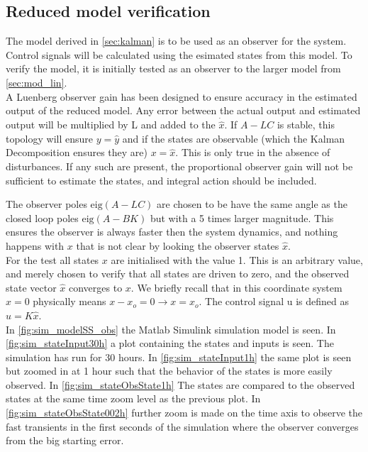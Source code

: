 \subsection{Reduced model verification}

The model derived in \cref{sec:kalman} is to be used as an observer for the system. Control signals will be calculated using the esimated states from this model. To verify the model, it is initially tested as an observer to the larger model from \cref{sec:mod_lin}.\\

A Luenberg observer gain has been designed to ensure accuracy in the estimated output of the reduced model. Any error between the actual output and estimated output will be multiplied by L and added to the $\dot{\hat{x}}$. If $A-LC$ is stable, this topology will ensure $y = \hat{y}$ and if the states are observable (which the Kalman Decomposition ensures they are) $x=\hat{x}$. This is only true in the absence of disturbances. If any such are present, the proportional observer gain will not be sufficient to estimate the states, and integral action should be included.

The observer poles $\text{eig}(A-LC)$ are chosen to be have the same angle as the closed loop poles $\text{eig}(A-BK)$ but with a 5 times larger magnitude. This ensures the observer is always faster then the system dynamics, and nothing happens with $x$ that is not clear by looking the observer states $\hat{x}$.\\

For the test all states $x$ are initialised with the value 1. This is an arbitrary value, and merely chosen to verify that all states are driven to zero, and the observed state vector $\hat{x}$ converges to $x$. We briefly recall that in this coordinate system $x=0$ physically means $x-x_o = 0 \rightarrow x=x_o$. The control signal u is defined as $u=K\hat{x}$.\\

In \cref{fig:sim_modelSS_obs} the Matlab Simulink simulation model is seen. In \cref{fig:sim_stateInput30h} a plot containing the states and inputs is seen. The simulation has run for 30 hours. In \cref{fig:sim_stateInput1h} the same plot is seen but zoomed in at 1 hour such that the behavior of the states is more easily observed. In \cref{fig:sim_stateObsState1h} The states are compared to the observed states at the same time zoom level as the previous plot. In \cref{fig:sim_stateObsState002h} further zoom is made on the time axis to observe the fast transients in the first seconds of the simulation where the observer converges from the big starting error.

